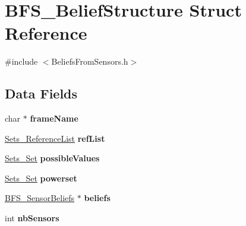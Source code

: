 \hypertarget{struct_b_f_s___belief_structure}{\section{B\-F\-S\-\_\-\-Belief\-Structure Struct Reference}
\label{struct_b_f_s___belief_structure}
}


{\ttfamily \#include $<$Beliefs\-From\-Sensors.\-h$>$}

\subsection*{Data Fields}
\begin{DoxyCompactItemize}
\item 
\hypertarget{struct_b_f_s___belief_structure_ab587a94be97e747de0805ad46f879ee1}{char $\ast$ {\bfseries frame\-Name}}\label{struct_b_f_s___belief_structure_ab587a94be97e747de0805ad46f879ee1}

\item 
\hypertarget{struct_b_f_s___belief_structure_a049bf9892d2d4204a553cdc04c82047e}{\hyperlink{struct_sets___reference_list}{Sets\-\_\-\-Reference\-List} {\bfseries ref\-List}}\label{struct_b_f_s___belief_structure_a049bf9892d2d4204a553cdc04c82047e}

\item 
\hypertarget{struct_b_f_s___belief_structure_afb7e056d2f11e2322e2bd59b85bfdfaa}{\hyperlink{struct_sets___set}{Sets\-\_\-\-Set} {\bfseries possible\-Values}}\label{struct_b_f_s___belief_structure_afb7e056d2f11e2322e2bd59b85bfdfaa}

\item 
\hypertarget{struct_b_f_s___belief_structure_aae6a9e4e860d569b6f451669fc5ea9dd}{\hyperlink{struct_sets___set}{Sets\-\_\-\-Set} {\bfseries powerset}}\label{struct_b_f_s___belief_structure_aae6a9e4e860d569b6f451669fc5ea9dd}

\item 
\hypertarget{struct_b_f_s___belief_structure_a83cd6ab3c5a3781b6b18f4062fdf0604}{\hyperlink{struct_b_f_s___sensor_beliefs}{B\-F\-S\-\_\-\-Sensor\-Beliefs} $\ast$ {\bfseries beliefs}}\label{struct_b_f_s___belief_structure_a83cd6ab3c5a3781b6b18f4062fdf0604}

\item 
\hypertarget{struct_b_f_s___belief_structure_a24ec5da519b25f42047e73ec9093a6a8}{int {\bfseries nb\-Sensors}}\label{struct_b_f_s___belief_structure_a24ec5da519b25f42047e73ec9093a6a8}

\end{DoxyCompactItemize}


